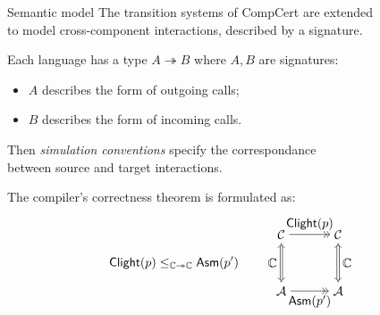 \documentclass[aspectratio=141]{beamer}
\newcommand{\kw}[1]{\ensuremath{ \mathsf{#1} }}
\begin{document}
\begin{frame}{Semantic model} %
  The transition systems of CompCert are extended \\ to model
  cross-component interactions, described by a signature.

  Each language has a type $A \twoheadrightarrow B$
  where $A, B$ are signatures:
  \begin{itemize}
    \item $A$ describes the form of outgoing calls;
    \item $B$ describes the form of incoming calls.
  \end{itemize}

  \pause
  Then \emph{simulation conventions} specify the correspondance \\
  between source and target interactions.

  \pause
  The compiler's correctness theorem is formulated as:
  \[
    \kw{Clight}(p) \le_{\mathbb{C} \twoheadrightarrow \mathbb{C}}
    \kw{Asm}(p')
    \qquad
    \begin{tikzpicture}[baseline=0.7cm,scale=0.8]
      \node (A1) at (-1,  2) {$\mathcal{C}$};
      \node (A2) at (-1,  0) {$\mathcal{A}$};
      \node (B1) at ( 1,  2) {$\mathcal{C}$};
      \node (B2) at ( 1,  0) {$\mathcal{A}$};
      \draw (A1) edge[->>] node[auto] {$\kw{Clight}(p)$} (B1);
      \draw (A2) edge[->>] node[below] {$\kw{Asm}(p')$} (B2);
      \begin{scope}[double equal sign distance, {Implies[]}-{Implies[]}]
        \draw (A1) edge[double] node[auto,swap] {$\mathbb{C}$} (A2);
        \draw (B1) edge[double] node[auto] {$\mathbb{C}$} (B2);
      \end{scope}
    \end{tikzpicture}
  \]
\end{frame}
\end{document}
